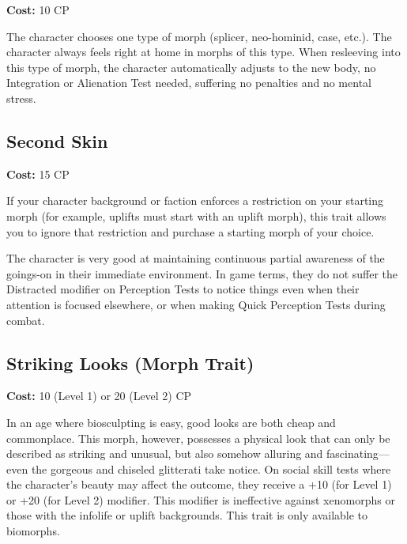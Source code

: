 \textbf{Cost:} 10 CP

The character chooses one type of morph (splicer, neo-hominid, case, etc.). The character always feels right at home in morphs of this type. When resleeving into this type of morph, the character automatically adjusts to the new body, no Integration or Alienation Test needed, suffering no penalties and no mental stress.

\subsection{Second Skin}
\label{sec:traits-secondskin}

\textbf{Cost:} 15 CP

If your character background or faction enforces a restriction on your starting morph (for example, uplifts must start with an uplift morph), this trait allows you to ignore that restriction and purchase a starting morph of your choice.


The character is very good at maintaining continuous partial awareness of the goings-on in their immediate environment. In game terms, they do not suffer the Distracted modifier on Perception Tests to notice things even when their attention is focused elsewhere, or when making Quick Perception Tests during combat.

\subsection{Striking Looks (Morph Trait)}
\label{sec:traits-striking-looks}

\textbf{Cost:} 10 (Level 1) or 20 (Level 2) CP

In an age where biosculpting is easy, good looks are both cheap and commonplace. This morph, however, possesses a physical look that can only be described as striking and unusual, but also somehow alluring and fascinating—even the gorgeous and chiseled glitterati take notice. On social skill tests where the character’s beauty may affect the outcome, they receive a +10 (for Level 1) or +20 (for Level 2) modifier. This modifier is ineffective against xenomorphs or those with the infolife or uplift backgrounds. This trait is only available to biomorphs.

